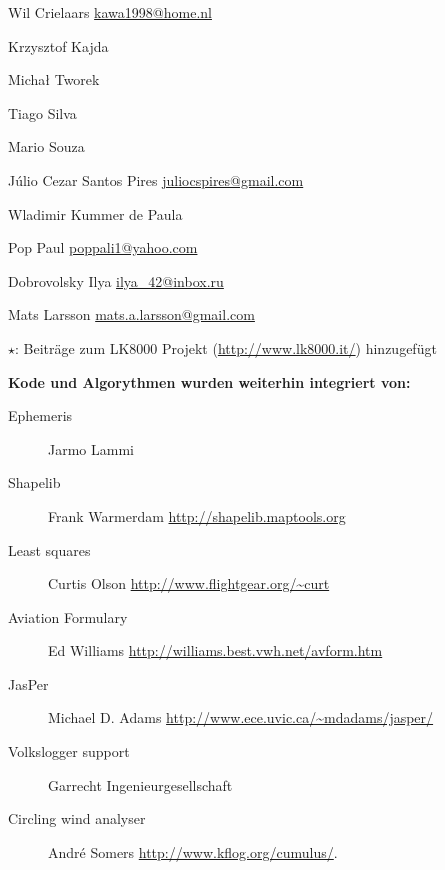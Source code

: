 \begin{compactitem}
\item Wil Crielaars \url{kawa1998@home.nl}
\item Krzysztof Kajda
\item Micha\l{}   Tworek %
\item Tiago Silva
\item Mario Souza
\item J\'ulio Cezar Santos Pires \url{juliocspires@gmail.com}
\item Wladimir Kummer de Paula
\item Pop Paul \url{poppali1@yahoo.com}
\item Dobrovolsky Ilya \url{ilya_42@inbox.ru}
\item Mats Larsson \url{mats.a.larsson@gmail.com}
\end{compactitem}

$\star$:  Beiträge zum  LK8000 Projekt (\url{http://www.lk8000.it/}) hinzugefügt

\vspace{1em}
{\large\bf Kode und Algorythmen wurden weiterhin integriert von:}
\begin{description}
\item[Ephemeris] Jarmo Lammi
\item[Shapelib] Frank Warmerdam \url{http://shapelib.maptools.org}
\item[Least squares] Curtis Olson \url{http://www.flightgear.org/~curt}
\item[Aviation Formulary] Ed Williams \url{http://williams.best.vwh.net/avform.htm}
\item[JasPer] Michael D. Adams \url{http://www.ece.uvic.ca/~mdadams/jasper/}
\item[Volkslogger support] Garrecht Ingenieurgesellschaft
\item[Circling wind analyser] Andr\'e Somers \url{http://www.kflog.org/cumulus/}.
\end{description}

